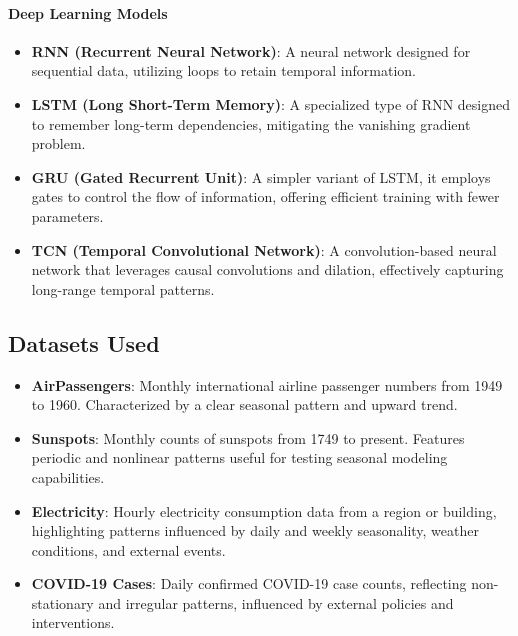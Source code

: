 \documentclass{article}
\begin{document}
\paragraph{Deep Learning Models}
\begin{itemize}
    \item \textbf{RNN (Recurrent Neural Network)}: A neural network designed for sequential data, utilizing loops to retain temporal information.
    \item \textbf{LSTM (Long Short-Term Memory)}: A specialized type of RNN designed to remember long-term dependencies, mitigating the vanishing gradient problem.
    \item \textbf{GRU (Gated Recurrent Unit)}: A simpler variant of LSTM, it employs gates to control the flow of information, offering efficient training with fewer parameters.
    \item \textbf{TCN (Temporal Convolutional Network)}: A convolution-based neural network that leverages causal convolutions and dilation, effectively capturing long-range temporal patterns.
\end{itemize}

\subsection{Datasets Used}
\begin{itemize}
    \item \textbf{AirPassengers}: Monthly international airline passenger numbers from 1949 to 1960. Characterized by a clear seasonal pattern and upward trend.
    \item \textbf{Sunspots}: Monthly counts of sunspots from 1749 to present. Features periodic and nonlinear patterns useful for testing seasonal modeling capabilities.
    \item \textbf{Electricity}: Hourly electricity consumption data from a region or building, highlighting patterns influenced by daily and weekly seasonality, weather conditions, and external events.
    \item \textbf{COVID-19 Cases}: Daily confirmed COVID-19 case counts, reflecting non-stationary and irregular patterns, influenced by external policies and interventions.
\end{itemize}
\end{document}
